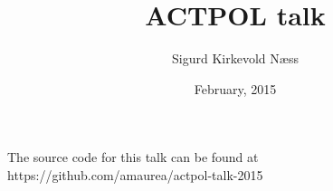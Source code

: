 \documentclass[table]{beamer}
\title{ACTPOL talk}
\author{Sigurd Kirkevold Næss}
\institute{Subdepartment of astrophysics, Oxford University}
\date{February, 2015}
\begin{document}
\begin{frame}
	\titlepage
	\vspace{-1cm}
	\begin{center}
	{\footnotesize The source code for this talk can be found at {\color[rgb]{0,0.7,0}https://github.com/amaurea/actpol-talk-2015}}
	\end{center}
\end{frame}







%
%
\end{document}
